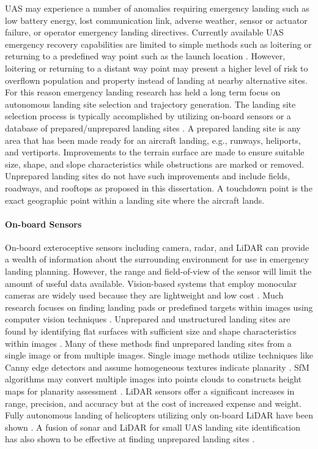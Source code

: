 \ac{UAS} may experience a number of anomalies requiring emergency landing such as low battery energy, lost communication link, adverse weather, sensor or actuator failure, or operator emergency landing directives. Currently available \ac{UAS} emergency recovery capabilities are limited to simple methods such as loitering or returning to a predefined way point such as the launch location \cite{Stansbury2015, mejias_alvarez_forced_2009}. However, loitering or returning to a distant way point may present a higher level of risk to overflown population and property instead of landing at nearby alternative sites. For this reason emergency landing research has held a long term focus on autonomous landing site selection and trajectory generation.
The landing site selection process is typically accomplished by utilizing on-board sensors or a database of prepared/unprepared landing sites \cite{warren_enabling_2015, ten_harmsel_emergency_2017}.  A prepared landing site is any area that has been made ready for an aircraft landing, e.g., runways, heliports, and vertiports. Improvements to the terrain surface are made to ensure suitable size, shape, and slope characteristics while obstructions are marked or removed. Unprepared landing sites do not have such improvements and include fields, roadways, and rooftops as proposed in this dissertation. A touchdown point is the exact geographic point within a landing site where the aircraft lands. 


\paragraph{On-board Sensors}

On-board exteroceptive sensors including camera, radar, and LiDAR can provide a wealth of information about the surrounding environment for use in emergency landing planning. However, the range and field-of-view of the sensor will limit the amount of useful data available. Vision-based systems that employ monocular cameras are widely used because they are lightweight and low cost \cite{jin_-board_2016}. Much research focuses on finding landing pads or predefined targets within images using computer vision techniques \cite{yang_autonomous_2014}. Unprepared and unstructured landing sites are found by identifying flat surfaces with sufficient size and shape characteristics within images \cite{warren_enabling_2015}. Many of these methods find unprepared landing sites from a single image or from multiple images. Single image methods utilize techniques like Canny edge detectors and assume homogeneous textures indicate planarity \cite{Wu2018, YuFeiShen2013}. \ac{SfM} algorithms may convert multiple images into points clouds to constructs height maps for planarity assessment \cite{forster_continuous_2015, desaraju_vision-based_2015}. LiDAR sensors offer a significant increases in range, precision, and accuracy but at the cost of increased expense and weight. Fully autonomous landing of helicopters utilizing only on-board LiDAR have been shown \cite{scherer_autonomous_2012, theodore_flight_2006}. A fusion of sonar and LiDAR for small UAS landing site identification has also shown to be effective at finding unprepared landing sites \cite{papa_uas_2018}. 




